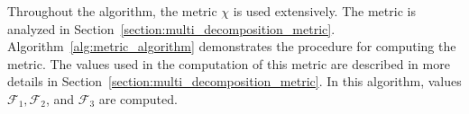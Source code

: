 \documentclass[../main.tex]{subfiles}
\begin{document}

Throughout the algorithm, the metric $\chi$ is used extensively. The metric is analyzed in Section~\ref{section:multi_decomposition_metric}. Algorithm~\ref{alg:metric_algorithm} demonstrates the procedure for computing the metric. The values used in the computation of this metric are described in more details in Section~\ref{section:multi_decomposition_metric}. In this algorithm, values $\mathcal{F}_1,\mathcal{F}_2$, and $\mathcal{F}_3$ are computed. 
\end{document}
